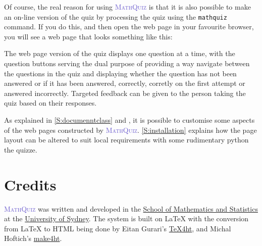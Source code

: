 \documentclass[svgnames]{article}
\def\MathQuiz{\textcolor{SlateBlue}{\textsc{MathQuiz}}\xspace}
\begin{document}
    Of course, the real reason for using \MathQuiz is that it is also
    possible to make an on-line version of the quiz by processing the
    quiz using the \texttt{mathquiz} command. If you do this, and then open
    the web page in your favourite browser, you will see a web page
    that looks something like this:

    \begin{center}
    \end{center}

    The web page version of the quiz displays one question at a time,
    with the question buttons serving the dual purpose of providing a
    way navigate between the questions in the quiz and displaying
    whether the question has not been answered or if it has been
    answered, correctly, corretly on the first attempt or answered
    incorrectly. Targeted feedback can be given to the person taking the
    quiz based on their responses.

    As explained in \autoref{S:documenntclass} and , it is possible to
    customise some aspects of the web pages constructed by \MathQuiz.
    \autoref{S:installation} explains how the page layout can be altered
    to suit local requirements with some rudimentary python the quizze.

\section{Credits}
    \MathQuiz{} was written and developed in the
    \href{http://www.maths.usyd.edu.au/}{School of Mathematics and
    Statistics} at the \href{http://www.usyd.edu.au/}{University of
    Sydney}.  The system is built on \LaTeX{} with the conversion from
    \LaTeX{} to HTML being done by Eitan Gurari's
    \href{http://www.cis.ohio-state.edu/~gurari/TeX4ht/mn.html}{TeX4ht},
    and Michal Hoftich's
    \href{https://github.com/michal-h21/make4ht}{make4ht}.
\end{document}
